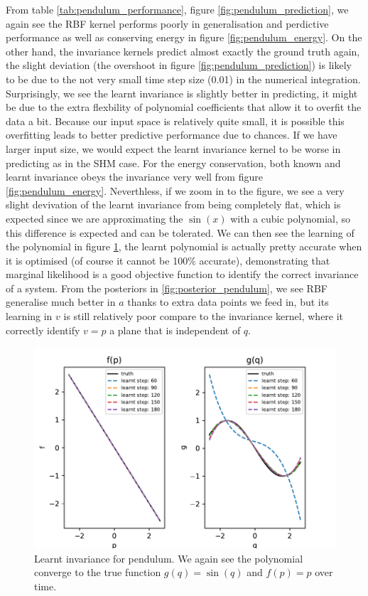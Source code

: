 \documentclass{statsmsc}
\begin{document}
From table \ref{tab:pendulum_performance}, figure \ref{fig:pendulum_prediction}, we again see the RBF kernel performs poorly in generalisation and perdictive performance as well as conserving energy in figure \ref{fig:pendulum_energy}.
On the other hand, the invariance kernels predict almost exactly the ground truth again, the slight deviation (the overshoot in figure \ref{fig:pendulum_prediction}) is likely to be due to the not very small time step size (0.01) in the numerical integration. 
Surprisingly, we see the learnt invariance is slightly better in predicting, it might be due to the extra flexbility of polynomial coefficients that allow it to overfit the data a bit. 
Because our input space is relatively quite small, it is possible this overfitting leads to better predictive performance due to chances.
If we have larger input size, we would expect the learnt invariance kernel to be worse in predicting as in the SHM case.
For the energy conservation, both known and learnt invariance obeys the invariance very well from figure \ref{fig:pendulum_energy}.
Neverthless, if we zoom in to the figure, we see a very slight devivation of the learnt invariance from being completely flat, which is expected since we are approximating the $\sin(x)$ with a cubic polynomial, so this difference is expected and can be tolerated.
We can then see the learning of the polynomial in figure \ref{fig:pendulum_learnt}, the learnt polynomial is actually pretty accurate when it is optimised (of course it cannot be 100\% accurate), demonstrating that marginal likelihood is a good objective function to identify the correct invariance of a system.
From the posteriors in \ref{fig:posterior_pendulum}, we see RBF generalise much better in $a$ thanks to extra data points we feed in, but its learning in $v$ is still relatively poor compare to the invariance kernel, where it correctly identify $v=p$ a plane that is independent of $q$.

\begin{figure}[H] 
  \includegraphics[width=0.8\linewidth]{../codes/figures/pendulum_learnt_over_time.pdf}
  \centering
  \caption{Learnt invariance for pendulum. We again see the polynomial converge to the true function $g(q)=\sin(q)$ and $f(p)=p$ over time.}
  \label{fig:pendulum_learnt}
\end{figure}
\end{document}
